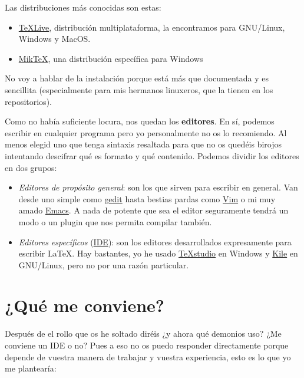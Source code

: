Las distribuciones más conocidas son estas:

\begin{itemize}
\tightlist
\item
  \href{http://www.tug.org/texlive/}{TeXLive}, distribución
  multiplataforma, la encontramos para GNU/Linux, Windows y MacOS.
\item
  \href{https://miktex.org/}{MikTeX}, una distribución específica para
  Windows
\end{itemize}

No voy a hablar de la instalación porque está más que documentada y es
sencillita (especialmente para mis hermanos linuxeros, que la tienen en
los repositorios).

Como no había suficiente locura, nos quedan los \textbf{editores}. En
sí, podemos escribir en cualquier programa pero yo personalmente no os
lo recomiendo. Al menos elegid uno que tenga sintaxis resaltada para que
no os quedéis birojos intentando descifrar qué es formato y qué
contenido. Podemos dividir los editores en dos grupos:

\begin{itemize}
\item
  \emph{Editores de propósito general}: son los que sirven para escribir
  en general. Van desde uno simple como
  \href{https://es.wikipedia.org/wiki/Gedit}{gedit} hasta bestias pardas
  como \href{http://www.vim.org/}{Vim} o mi muy amado
  \href{https://www.gnu.org/software/emacs/}{Emacs}. A nada de potente
  que sea el editor seguramente tendrá un modo o un plugin que nos
  permita compilar también.
\item
  \emph{Editores específicos}
  (\href{https://es.wikipedia.org/wiki/Entorno_de_desarrollo_integrado}{IDE}):
  son los editores desarrollados expresamente para escribir LaTeX. Hay
  bastantes, yo he usado
  \href{http://texstudio.sourceforge.net/}{TeXstudio} en Windows y
  \href{http://kile.sourceforge.net/}{Kile} en GNU/Linux, pero no por
  una razón particular.
\end{itemize}

\section{¿Qué me conviene?}\label{quuxe9-me-conviene}

Después de el rollo que os he soltado diréis ¿y ahora qué demonios uso?
¿Me conviene un IDE o no? Pues a eso no os puedo responder directamente
porque depende de vuestra manera de trabajar y vuestra experiencia, esto
es lo que yo me plantearía:


